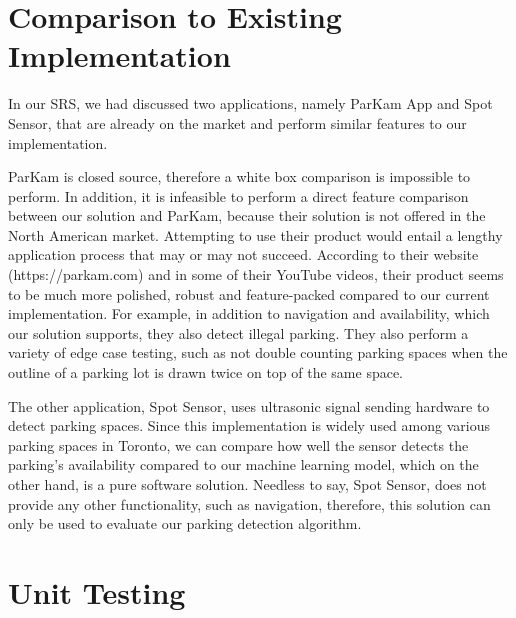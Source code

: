 \documentclass[12pt, titlepage]{article}
\begin{document}
\newpage
\section{Comparison to Existing Implementation}	

In our SRS, we had discussed two applications, namely ParKam App and Spot
Sensor, that are already on the market and perform similar features to our
implementation. 

ParKam is closed source, therefore a white box comparison is impossible to
perform. In addition, it is infeasible to perform a direct feature comparison
between our solution and ParKam, because their solution is not offered in the
North American market. Attempting to use their product would entail a lengthy
application process that may or may not succeed. According to their website
(https://parkam.com) and in some of their YouTube videos, their product seems to
be much more polished, robust and feature-packed compared to our current
implementation. For example, in addition to navigation and availability, which
our solution supports, they also detect illegal parking. They also perform a
variety of edge case testing, such as not double counting parking spaces when
the outline of a parking lot is drawn twice on top of the same space.

The other application, Spot Sensor, uses ultrasonic signal sending hardware to
detect parking spaces. Since this implementation is widely used among various
parking spaces in Toronto, we can compare how well the sensor detects the
parking's availability compared to our machine learning model, which on the
other hand, is a pure software solution. Needless to say, Spot Sensor, does not
provide any other functionality, such as navigation, therefore, this solution
can only be used to evaluate our parking detection algorithm.

\newpage
\section{Unit Testing}
\end{document}
